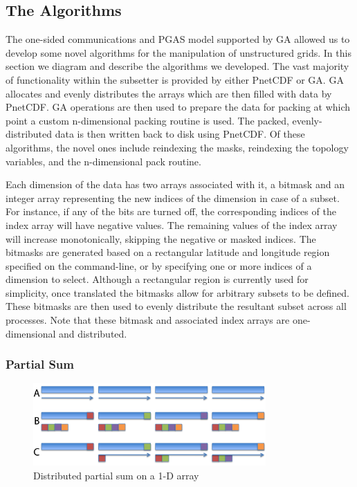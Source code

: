 \subsection{The Algorithms}

The one-sided communications and PGAS model supported by GA allowed us to
develop some novel algorithms for the manipulation of unstructured grids.  In
this section we diagram and describe the algorithms we developed.  The vast
majority of functionality within the subsetter is provided by either PnetCDF
or GA.  GA allocates and evenly distributes the arrays which are then filled
with data by PnetCDF.  GA operations are then used to prepare the data for
packing at which point a custom n-dimensional packing routine is used.  The
packed, evenly-distributed data is then written back to disk using PnetCDF.
Of these algorithms, the novel ones include reindexing the masks, reindexing
the topology variables, and the n-dimensional pack routine.

Each dimension of the data has two arrays associated with it, a bitmask and an
integer array representing the new indices of the dimension in case of a
subset.  For instance, if any of the bits are turned off, the corresponding
indices of the index array will have negative values.  The remaining values of
the index array will increase monotonically, skipping the negative or masked
indices.  The bitmasks are generated based on a rectangular latitude and
longitude region specified on the command-line, or by specifying one or more
indices of a dimension to select.  Although a rectangular region is currently
used for simplicity, once translated the bitmasks allow for arbitrary subsets
to be defined.  These bitmasks are then used to evenly distribute the
resultant subset across all processes.  Note that these bitmask and associated
index arrays are one-dimensional and distributed.

\subsubsection{Partial Sum}

\begin{figure}[!t]
\center
\includegraphics[width=3.5in]{images/partialsum_label}
\caption{Distributed partial sum on a 1-D array}
\label{fig:partialsum}
\end{figure}

